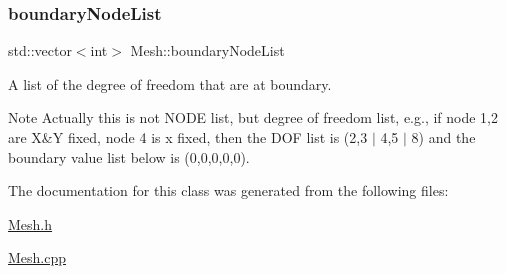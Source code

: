 \subsubsection{\texorpdfstring{boundary\+Node\+List}{boundaryNodeList}}
{\footnotesize\ttfamily std\+::vector$<$int$>$ Mesh\+::boundary\+Node\+List}



A list of the degree of freedom that are at boundary. 

\begin{DoxyNote}{Note}
Actually this is not N\+O\+DE list, but degree of freedom list, e.\+g., if node 1,2 are X\&Y fixed, node 4 is x fixed, then the D\+OF list is (2,3 $\vert$ 4,5 $\vert$ 8) and the boundary value list below is (0,0,0,0,0). 
\end{DoxyNote}


The documentation for this class was generated from the following files\+:\begin{DoxyCompactItemize}
\item 
\mbox{\hyperlink{_mesh_8h}{Mesh.\+h}}\item 
\mbox{\hyperlink{_mesh_8cpp}{Mesh.\+cpp}}\end{DoxyCompactItemize}
